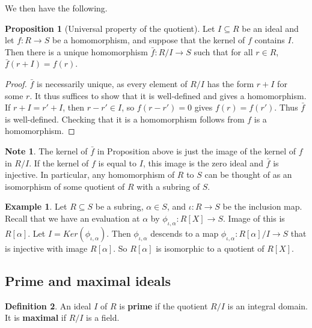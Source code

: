 \documentclass{article}
\newcommand{\rb}[1]{\left( #1 \right)}
\renewcommand{\sb}[1]{\left[ #1 \right]}
\theoremstyle{definition}\newtheorem{definition}{Definition}[subsection]
\theoremstyle{definition}\newtheorem{remark}[definition]{Remark}
\theoremstyle{definition}\newtheorem*{example}{Example}
\theoremstyle{definition}\newtheorem*{note}{Note}
\newtheorem{proposition}[definition]{Proposition}
\begin{document}
We then have the following.

\begin{proposition}[Universal property of the quotient]
\label{prop:2.5.1}
Let $ I \subseteq R $ be an ideal and let $ f : R \to S $ be a homomorphism, and suppose that the kernel of $ f $ contains $ I $. Then there is a unique homomorphism $ \bar{f} : R / I \to S $ such that for all $ r \in R $, $ \bar{f}\rb{r + I} = f\rb{r} $.
\end{proposition}

\begin{proof}
$ \bar{f} $ is necessarily unique, as every element of $ R / I $ has the form $ r + I $ for some $ r $. It thus suffices to show that it is well-defined and gives a homomorphism. If $ r + I = r' + I $, then $ r - r' \in I $, so $ f\rb{r - r'} = 0 $ gives $ f\rb{r} = f\rb{r'} $. Thus $ \bar{f} $ is well-defined. Checking that it is a homomorphism follows from $ f $ is a homomorphism.
\end{proof}

\begin{note}
The kernel of $ \bar{f} $ in Proposition above is just the image of the kernel of $ f $ in $ R / I $. If the kernel of $ f $ is equal to $ I $, this image is the zero ideal and $ \bar{f} $ is injective. In particular, any homomorphism of $ R $ to $ S $ can be thought of as an isomorphism of some quotient of $ R $ with a subring of $ S $.
\end{note}

\begin{example}
Let $ R \subseteq S $ be a subring, $ \alpha \in S $, and $ \iota : R \to S $ be the inclusion map. Recall that we have an evaluation at $ \alpha $ by $ \phi_{\iota, \alpha} : R\sb{X} \to S $. Image of this is $ R\sb{\alpha} $. Let $ I = Ker\rb{\phi_{\iota, \alpha}} $. Then $ \phi_{\iota, \alpha} $ descends to a map $ \phi_{\iota, \alpha} : R\sb{\alpha} / I \to S $ that is injective with image $ R\sb{\alpha} $. So $ R\sb{\alpha} $ is isomorphic to a quotient of $ R\sb{X} $.
\end{example}


\subsection{Prime and maximal ideals}

\begin{definition}
\label{def:2.6.1}
An ideal $ I $ of $ R $ is \textbf{prime} if the quotient $ R / I $ is an integral domain. It is \textbf{maximal} if $ R / I $ is a field.
\end{definition}
\end{document}
